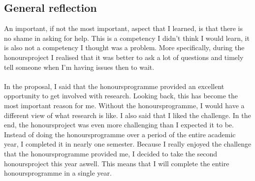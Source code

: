\subsection{General reflection}
An important, if not the most important, aspect that I learned, is that there is no shame in asking for help. This is a competency I didn't think I would learn, it is also not a competency I thought was a problem. More specifically, during the honoursproject I realised that it was better to ask a lot of questions and timely tell someone when I'm having issues then to wait. \\
\\
In the proposal, I said that the honoursprogramme provided an excellent opportunity to get involved with research. Looking back, this has become the most important reason for me. Without the honoursprogramme, I would have a different view of what research is like. I also said that I liked the challenge. In the end, the honoursproject was even more challenging than I expected it to be. Instead of doing the honoursprogramme over a period of the entire academic year, I completed it in nearly one semester. Because I really enjoyed the challenge that the honoursprogramme provided me, I decided to take the second honoursproject this year aswell. This means that I will complete the entire honoursprogramme in a single year.

